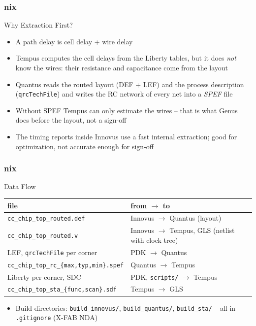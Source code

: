 \documentclass{beamer}
\newcommand{\astitle}{nix}
\newcommand{\assubtitle}{nix}
\newcommand{\cmd}[1]{\texttt{#1}}
\begin{document}
\renewcommand{\assubtitle}{Why Extraction First?}
\begin{frame}
\frametitle{\astitle}
\begin{block}{\assubtitle}
  \begin{itemize}
    \item A path delay is cell delay + wire delay
    \item Tempus computes the cell delays from the Liberty tables, but it
      does \emph{not} know the wires: their resistance and capacitance
      come from the layout
    \item Quantus reads the routed layout (DEF + LEF) and the process
      description (\cmd{qrcTechFile}) and writes the RC network of every
      net into a \emph{SPEF} file
    \item Without SPEF Tempus can only estimate the wires -- that is what
      Genus does before the layout, not a sign-off
    \item The timing reports inside Innovus use a fast internal
      extraction; good for optimization, not accurate enough for sign-off
  \end{itemize}
\end{block}
\end{frame}

\renewcommand{\assubtitle}{Data Flow}
\begin{frame}
\frametitle{\astitle}
\begin{block}{\assubtitle}
  \footnotesize
  \begin{tabularx}{\linewidth}{@{}lY@{}}
    \textbf{file} & \textbf{from $\rightarrow$ to}\\\hline
    \cmd{cc\_chip\_top\_routed.def} & Innovus $\rightarrow$ Quantus (layout)\\
    \cmd{cc\_chip\_top\_routed.v}   & Innovus $\rightarrow$ Tempus, GLS (netlist with clock tree)\\
    LEF, \cmd{qrcTechFile} per corner & PDK $\rightarrow$ Quantus\\
    \cmd{cc\_chip\_top\_rc\_\{max,typ,min\}.spef} & Quantus $\rightarrow$ Tempus\\
    Liberty per corner, SDC         & PDK, \cmd{scripts/} $\rightarrow$ Tempus\\
    \cmd{cc\_chip\_top\_sta\_\{func,scan\}.sdf} & Tempus $\rightarrow$ GLS\\
  \end{tabularx}
  \vspace{4pt}
  \begin{itemize}
    \item Build directories: \cmd{build\_innovus/}, \cmd{build\_quantus/},
      \cmd{build\_sta/} -- all in \cmd{.gitignore} (X-FAB NDA)
  \end{itemize}
\end{block}
\end{frame}
\end{document}

